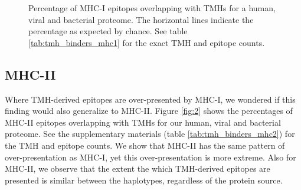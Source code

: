 \begin{figure}[!htbp]
  \caption{
    Percentage of MHC-I epitopes overlapping with TMHs
    for a human, viral and bacterial proteome.
    The horizontal lines indicate the percentage as expected by chance.
    See table \ref{tab:tmh_binders_mhc1} for the exact TMH and epitope counts.
  }
  \label{fig:1}
\end{figure}

\subsection{MHC-II}

Where TMH-derived epitopes are over-presented by MHC-I,
we wondered if this finding would also generalize to MHC-II.
Figure \ref{fig:2} shows the percentages of MHC-II epitopes overlapping 
with TMHs for our human, viral and bacterial proteome.
See the supplementary materials (table \ref{tab:tmh_binders_mhc2}) 
for the TMH and epitope counts.
We show that MHC-II has the same pattern of over-presentation
as MHC-I, yet this over-presentation is more extreme.
Also for MHC-II, we observe that the extent the which TMH-derived
epitopes are presented is similar between the haplotypes, regardless
of the protein source.

